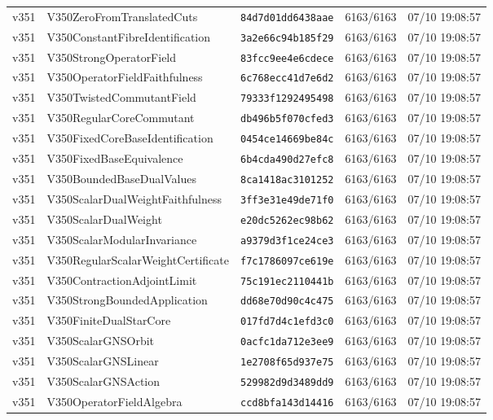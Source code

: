 \documentclass[11pt]{article}
\theoremstyle{definition}\newtheorem{deriv}{Derivação}
\begin{document}
{\begin{longtable}{@{}lllll@{}}
v351 & V350ZeroFromTranslatedCuts & \texttt{84d7d01dd6438aae} & 6163/6163 & 07/10 19:08:57 \\
v351 & V350ConstantFibreIdentification & \texttt{3a2e66c94b185f29} & 6163/6163 & 07/10 19:08:57 \\
v351 & V350StrongOperatorField & \texttt{83fcc9ee4e6cdece} & 6163/6163 & 07/10 19:08:57 \\
v351 & V350OperatorFieldFaithfulness & \texttt{6c768ecc41d7e6d2} & 6163/6163 & 07/10 19:08:57 \\
v351 & V350TwistedCommutantField & \texttt{79333f1292495498} & 6163/6163 & 07/10 19:08:57 \\
v351 & V350RegularCoreCommutant & \texttt{db496b5f070cfed3} & 6163/6163 & 07/10 19:08:57 \\
v351 & V350FixedCoreBaseIdentification & \texttt{0454ce14669be84c} & 6163/6163 & 07/10 19:08:57 \\
v351 & V350FixedBaseEquivalence & \texttt{6b4cda490d27efc8} & 6163/6163 & 07/10 19:08:57 \\
v351 & V350BoundedBaseDualValues & \texttt{8ca1418ac3101252} & 6163/6163 & 07/10 19:08:57 \\
v351 & V350ScalarDualWeightFaithfulness & \texttt{3ff3e31e49de71f0} & 6163/6163 & 07/10 19:08:57 \\
v351 & V350ScalarDualWeight & \texttt{e20dc5262ec98b62} & 6163/6163 & 07/10 19:08:57 \\
v351 & V350ScalarModularInvariance & \texttt{a9379d3f1ce24ce3} & 6163/6163 & 07/10 19:08:57 \\
v351 & V350RegularScalarWeightCertificate & \texttt{f7c1786097ce619e} & 6163/6163 & 07/10 19:08:57 \\
v351 & V350ContractionAdjointLimit & \texttt{75c191ec2110441b} & 6163/6163 & 07/10 19:08:57 \\
v351 & V350StrongBoundedApplication & \texttt{dd68e70d90c4c475} & 6163/6163 & 07/10 19:08:57 \\
v351 & V350FiniteDualStarCore & \texttt{017fd7d4c1efd3c0} & 6163/6163 & 07/10 19:08:57 \\
v351 & V350ScalarGNSOrbit & \texttt{0acfc1da712e3ee9} & 6163/6163 & 07/10 19:08:57 \\
v351 & V350ScalarGNSLinear & \texttt{1e2708f65d937e75} & 6163/6163 & 07/10 19:08:57 \\
v351 & V350ScalarGNSAction & \texttt{529982d9d3489dd9} & 6163/6163 & 07/10 19:08:57 \\
v351 & V350OperatorFieldAlgebra & \texttt{ccd8bfa143d14416} & 6163/6163 & 07/10 19:08:57 \\

\end{longtable}}
\end{document}

